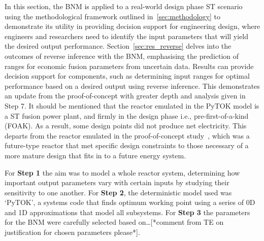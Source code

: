 \documentclass[journal]{IEEEtran}
\begin{document}
In this section, the BNM is applied to a real-world design phase ST scenario using the methodological framework outlined in~\ref{sec:methodology} to demonstrate its utility in providing decision support for engineering design, where engineers and researchers need to identify the input parameters that will yield the desired output performance. Section~\ref{sec:res_reverse} delves into the outcomes of reverse inference with the BNM, emphasising the prediction of ranges for economic fusion parameters from uncertain data. Results can provide decision support for components, such as determining input ranges for optimal performance based on a desired output using reverse inference. This demonstrates an update from the proof-of-concept with greater depth and analysis given in Step 7. It should be mentioned that the reactor emulated in the PyTOK model is a ST fusion power plant, and firmly in the design phase i.e., pre-first-of-a-kind (FOAK). As a result, some design points did not produce net electricity. This departs from the reactor emulated in the proof-of-concept study~\cite{Griffiths2024}, which was a future-type reactor that met specific design constraints to those necessary of a more mature design that fits in to a future energy system.

For \textbf{Step 1} the aim was to model a whole reactor system, determining how important output parameters vary with certain inputs by studying their sensitivity to one another. For \textbf{Step 2}, the deterministic  model used was `PyTOK', a systems code that finds optimum working point using a series of 0D and 1D approximations that model all subsystems. For \textbf{Step 3} the parameters for the BNM were carefully selected based on\ldots [*comment from TE on justification for chosen parameters please*].
\end{document}
